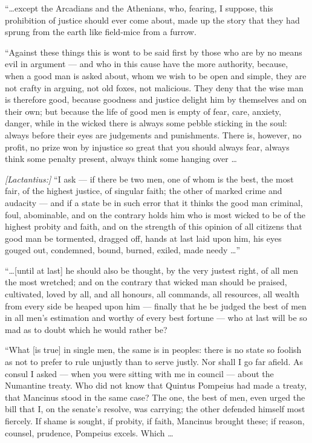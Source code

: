  ``\ldots except the Arcadians and the Athenians, who, fearing, I suppose, this prohibition of justice should ever come about, made up the story that they had sprung from the earth like field-mice from a furrow.

 ``Against these things this is wont to be said first by those who are by no means evil in argument --- and who in this cause have the more authority, because, when a good man is asked about, whom we wish to be open and simple, they are not crafty in arguing, not old foxes, not malicious. They deny that the wise man is therefore good, because goodness and justice delight him by themselves and on their own; but because the life of good men is empty of fear, care, anxiety, danger, while in the wicked there is always some pebble sticking in the soul: always before their eyes are judgements and punishments. There is, however, no profit, no prize won by injustice so great that you should always fear, always think some penalty present, always think some hanging over \ldots

 \textit{[Lactantius:]} ``I ask --- if there be two men, one of whom is the best, the most fair, of the highest justice, of singular faith; the other of marked crime and audacity --- and if a state be in such error that it thinks the good man criminal, foul, abominable, and on the contrary holds him who is most wicked to be of the highest probity and faith, and on the strength of this opinion of all citizens that good man be tormented, dragged off, hands at last laid upon him, his eyes gouged out, condemned, bound, burned, exiled, made needy \ldots''

 ``\ldots [until at last] he should also be thought, by the very justest right, of all men the most wretched; and on the contrary that wicked man should be praised, cultivated, loved by all, and all honours, all commands, all resources, all wealth from every side be heaped upon him --- finally that he be judged the best of men in all men's estimation and worthy of every best fortune --- who at last will be so mad as to doubt which he would rather be?

 ``What [is true] in single men, the same is in peoples: there is no state so foolish as not to prefer to rule unjustly than to serve justly. Nor shall I go far afield. As consul I asked --- when you were sitting with me in council --- about the Numantine treaty. Who did not know that Quintus Pompeius had made a treaty, that Mancinus stood in the same case? The one, the best of men, even urged the bill that I, on the senate's resolve, was carrying; the other defended himself most fiercely. If shame is sought, if probity, if faith, Mancinus brought these; if reason, counsel, prudence, Pompeius excels. Which \ldots

